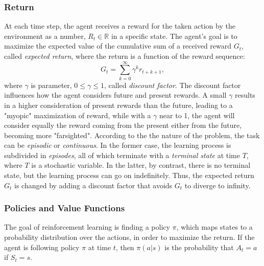 \subsubsection{Return}
At each time step, the agent receives a reward for the taken action by the environment as a number,  $R_t \in \mathbb{R}$ in a specific state. The agent's goal is to maximize the expected value of the cumulative sum of a received reward $G_t$, called \textit{expected return}, where the return is a function of the reward sequence:\begin{equation}G_t = \sum^{\infty}_{k=0}\gamma^k r_{t + k +1},\label{eqn:return}\end{equation}
where $\gamma$ is  parameter, \(0 \leq \gamma \leq 1\), called \textit{discount factor}. The discount factor influences how the agent considers future and present rewards. A small \(\gamma\) results in a higher consideration of present rewards than the future, leading to a "myopic" maximization of reward, while with a \(\gamma\) near to 1, the agent will consider equally the reward coming from the present either from the future, becoming more "farsighted". According to the the nature of the problem, the task can be \textit{episodic} or \textit{continuous}. In the former case, the learning process is subdivided in \textit{episodes}, all of which terminate with a \textit{terminal state} at time $T$, where $T$ is a stochastic variable. In the latter, by contrast, there is no terminal state, but the learning process can go on indefinitely. Thus, the expected return $G_t$ is changed by adding a discount factor that avoids $G_t$ to diverge to infinity.


\subsubsection{Policies and Value Functions}
The goal of reinforcement learning is finding a policy \(\pi\), which maps states to a probability distribution over the actions, in order to maximize the return. If the agent is following policy $\pi$ at time $t$, then $\pi(a|s)$ is the probability that $A_t = a$ if $S_t = s$. 

